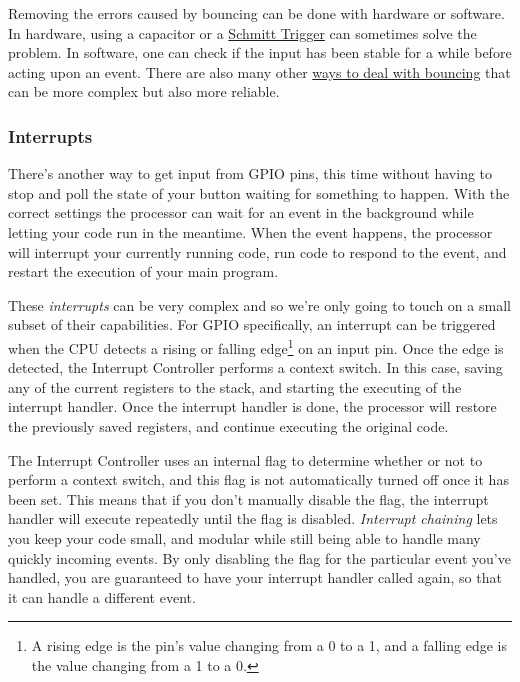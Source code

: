 \documentclass[]{article}
\begin{document}
Removing the errors caused by bouncing can be done with hardware or
software. In hardware, using a capacitor or a
\href{http://en.wikipedia.org/wiki/Schmitt_trigger}{Schmitt Trigger} can
sometimes solve the problem. In software, one can check if the input has
been stable for a while before acting upon an event. There are also many
other \href{http://www.eng.utah.edu/~cs5780/debouncing.pdf}{ways to deal
with bouncing} that can be more complex but also more reliable.

\subsubsection{Interrupts}

There's another way to get input from GPIO pins, this time without
having to stop and poll the state of your button waiting for something
to happen. With the correct settings the processor can wait for an event
in the background while letting your code run in the meantime. When the
event happens, the processor will interrupt your currently running code,
run code to respond to the event, and restart the execution of your main
program.

These \emph{interrupts} can be very complex and so we're only going to
touch on a small subset of their capabilities. For GPIO specifically, an
interrupt can be triggered when the CPU detects a rising or falling
edge\footnote{A rising edge is the pin's value changing from a 0 to a 1,
  and a falling edge is the value changing from a 1 to a 0.} on an input
pin. Once the edge is detected, the Interrupt Controller performs a
context switch. In this case, saving any of the current registers to the
stack, and starting the executing of the interrupt handler. Once the
interrupt handler is done, the processor will restore the previously
saved registers, and continue executing the original code.

The Interrupt Controller uses an internal flag to determine whether or
not to perform a context switch, and this flag is not automatically
turned off once it has been set. This means that if you don't manually
disable the flag, the interrupt handler will execute repeatedly until
the flag is disabled. \emph{Interrupt chaining} lets you keep your code
small, and modular while still being able to handle many quickly
incoming events. By only disabling the flag for the particular event
you've handled, you are guaranteed to have your interrupt handler called
again, so that it can handle a different event.
\end{document}
